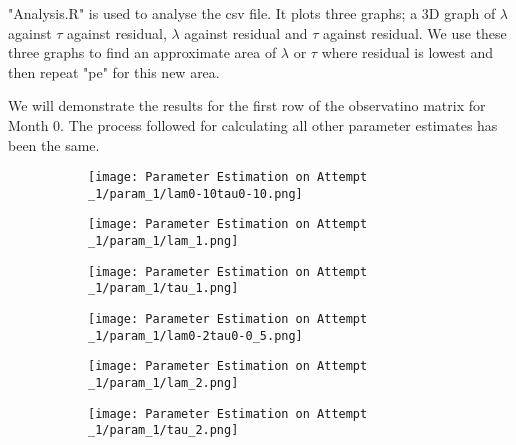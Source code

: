 "Analysis.R" is used to analyse the csv file. It plots three graphs; a 3D graph of $\lambda$ against $\tau$ against residual, $\lambda$ against residual and $\tau$ against residual. We use these three graphs to find an approximate area of $\lambda$ or $\tau$ where residual is lowest and then repeat "pe" for this new area. 

We will demonstrate the results for the first row of the observatino matrix for Month 0. The process followed for calculating all other parameter estimates has been the same. 

\begin{figure}
    \begin{subfigure}{.8\textwidth}
      \centering
      \texttt{[image: Parameter Estimation on Attempt \_1/param\_1/lam0-10tau0-10.png]}
      \caption{}
      \label{pe1:1}
    \end{subfigure}

    \begin{subfigure}{.45\textwidth}
      \centering
      \texttt{[image: Parameter Estimation on Attempt \_1/param\_1/lam\_1.png]}
      \caption{}
      \label{pe1:2}
    \end{subfigure}
    \begin{subfigure}{.45\textwidth}
      \centering
      \texttt{[image: Parameter Estimation on Attempt \_1/param\_1/tau\_1.png]}
      \caption{}
      \label{pe1:3}
    \end{subfigure}
    \caption{}
    \label{pe1}
\end{figure}

\begin{figure}
    \begin{subfigure}{.8\textwidth}
      \centering
      \texttt{[image: Parameter Estimation on Attempt \_1/param\_1/lam0-2tau0-0\_5.png]}
      \caption{}
      \label{pe2:1}
    \end{subfigure}

    \begin{subfigure}{.45\textwidth}
      \centering
      \texttt{[image: Parameter Estimation on Attempt \_1/param\_1/lam\_2.png]}
      \caption{}
      \label{pe2:2}
    \end{subfigure}
    \begin{subfigure}{.45\textwidth}
      \centering
      \texttt{[image: Parameter Estimation on Attempt \_1/param\_1/tau\_2.png]}
      \caption{}
      \label{pe2:3}
    \end{subfigure}
    \caption{}
    \label{pe2}
\end{figure}

